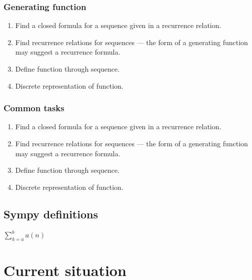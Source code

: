\documentclass[a4paper]{article}
\begin{document}
         \subsubsection{Generating function}
             \begin{enumerate}
                \item Find a closed formula for a sequence given in a recurrence relation.
                
                \item Find recurrence relations for sequences — the form of a generating function may suggest a recurrence formula.
                
                \item Define function through sequence.
                
                \item Discrete representation of function.
             \end{enumerate}
        
        \subsubsection{Common tasks}
             \begin{enumerate}
                \item Find a closed formula for a sequence given in a recurrence relation.
                
                \item Find recurrence relations for sequences — the form of a generating function may suggest a recurrence formula.
                
                \item Define function through sequence.
                
                \item Discrete representation of function.
             \end{enumerate}

    
\subsection{Sympy definitions}

$\sum_{k=a}^b a(n)$

\section{Current situation}
\end{document}

